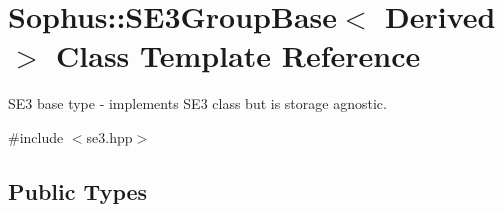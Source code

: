 \hypertarget{class_sophus_1_1_s_e3_group_base}{}\section{Sophus\+:\+:S\+E3\+Group\+Base$<$ Derived $>$ Class Template Reference}
\label{class_sophus_1_1_s_e3_group_base}


S\+E3 base type -\/ implements S\+E3 class but is storage agnostic.  




{\ttfamily \#include $<$se3.\+hpp$>$}

\subsection*{Public Types}
